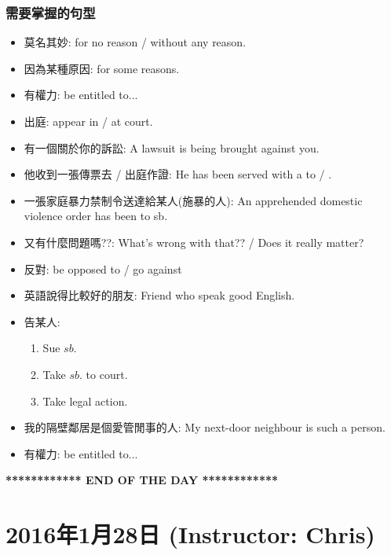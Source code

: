 \subsubsection*{需要掌握的句型}
\begin{itemize}
  \itemsep0em
  \item 莫名其妙: for no reason / without any reason.
  \item 因為某種原因: for some reasons.
  \item 有權力: be entitled to...
  \item 出庭: appear in / at court.
  \item 有一個關於你的訴訟: A lawsuit is being brought against you.
  \item 他收到一張傳票去 / 出庭作證: He has been served with a  to  / .
  \item 一張家庭暴力禁制令送達給某人(施暴的人): An apprehended domestic violence order has been  to sb.
  \item 又有什麼問題嗎??: What's wrong with that?? / Does it really matter?
  \item 反對: be opposed to / go against
  \item 英語說得比較好的朋友: Friend who speak  good English.
  \item 告某人:
  \begin{enumerate}
    \itemsep0em
    \item Sue $sb.$
    \item Take $sb.$ to court.
    \item Take legal action.
  \end{enumerate}
  \item 我的隔壁鄰居是個愛管閒事的人: My next-door neighbour is such a person.
  \item 有權力: be entitled to...
\end{itemize}

\vspace{15mm}

\begin{center}
  \textbf{************ END OF THE DAY ************}
\end{center}

\newpage

\section{2016年1月28日 (Instructor: Chris)}

